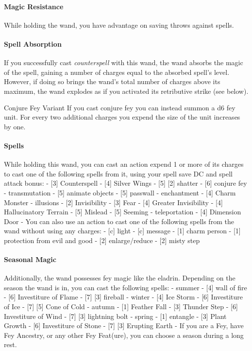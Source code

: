 \documentclass[letter,10pt,twocolumn,openany]{dndbook}
\begin{document}
\paragraph{Magic Resistance}
    While holding the wand, you have advantage on saving throws against spells.

\paragraph{Spell Absorption}
    If you successfully cast \textit{counterspell} with this wand, the wand absorbs the magic of the spell, gaining a number of charges equal to the absorbed spell's level.
    However, if doing so brings the wand's total number of charges above its maximum, the wand explodes as if you activated its retributive strike (see below).

\begin{DndComment}{Conjure Fey Variant}
    If you cast conjure fey you can instead summon a d6 fey unit.
    For every two additional charges you expend the size of the unit increases by one.
\end{DndComment}

\paragraph{Spells}
  While holding this wand, you can cast an action expend 1 or more of its charges to cast one of the following spells from it, using your spell save DC and spell attack bonus:
  - [3] Counterspell
  - [4] Silver Wings
  - [5] [2] shatter
  - [6] conjure fey
  - transmutation
    - [5] animate objects
    - [5] passwall
  - enchantment
    - [4] Charm Monster
  - illusions
    - [2] Invisibility
    - [3] Fear
    - [4] Greater Invisibility
    - [4] Hallucinatory Terrain
    - [5] Mislead
    - [5] Seeming
  - teleportation
    - [4] Dimension Door
- You can also use an action to cast one of the following spells from the wand without using any charges:
  - [c] light
  - [c] message
  - [1] charm person
  - [1] protection from evil and good
  - [2] enlarge/reduce
  - [2] misty step

\paragraph{Seasonal Magic}
  Additionally, the wand possesses fey magic like the eladrin.
  Depending on the season the wand is in, you can cast the following spells:
  - summer
    - [4] wall of fire
    - [6] Investiture of Flame
    - [7] [3] fireball
  - winter
    - [4] Ice Storm
    - [6] Investiture of Ice
    - [7] [5] Cone of Cold
  - autumn
    - [1] Feather Fall
    - [3] Thunder Step
    - [6] Investiture of Wind
    - [7] [3] lightning bolt
  - spring
    - [1] entangle
    - [3] Plant Growth
    - [6] Investiture of Stone
    - [7] [3] Erupting Earth
- If you are a Fey, have Fey Ancestry, or any other Fey Feat(ure), you can choose a season during a long rest.
\end{document}
